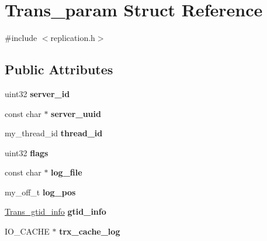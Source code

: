 \hypertarget{structTrans__param}{}\section{Trans\+\_\+param Struct Reference}
\label{structTrans__param}


{\ttfamily \#include $<$replication.\+h$>$}

\subsection*{Public Attributes}
\begin{DoxyCompactItemize}
\item 
\mbox{\label{structTrans__param_a24609a573830adfccdd90bb62af405df}} 
uint32 {\bfseries server\+\_\+id}
\item 
\mbox{\label{structTrans__param_a101ca204be864a02b48804c712e04ac9}} 
const char $\ast$ {\bfseries server\+\_\+uuid}
\item 
\mbox{\label{structTrans__param_a952fc8461d13d785b00b0e56041e0550}} 
my\+\_\+thread\+\_\+id {\bfseries thread\+\_\+id}
\item 
\mbox{\label{structTrans__param_af34bd91f1d1f3cc85d7e397b71efb001}} 
uint32 {\bfseries flags}
\item 
\mbox{\label{structTrans__param_a4c9e8b6821d52f52391e1837d3006b96}} 
const char $\ast$ {\bfseries log\+\_\+file}
\item 
\mbox{\label{structTrans__param_a427737f9a826b31e3b89e05c98338ccb}} 
my\+\_\+off\+\_\+t {\bfseries log\+\_\+pos}
\item 
\mbox{\label{structTrans__param_a64a440b389b751de2411e0e62ae8c937}} 
\mbox{\hyperlink{structTrans__gtid__info}{Trans\+\_\+gtid\+\_\+info}} {\bfseries gtid\+\_\+info}
\item 
\mbox{\label{structTrans__param_ac3124d8229ef8b89cb8908c75fb9d25a}} 
I\+O\+\_\+\+C\+A\+C\+HE $\ast$ {\bfseries trx\+\_\+cache\+\_\+log}
\item 

\end{DoxyCompactItemize}
